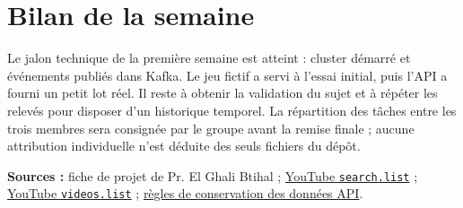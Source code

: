 \documentclass[11pt,a4paper]{article}
\begin{document}
\section{Bilan de la semaine}

Le jalon technique de la première semaine est atteint : cluster démarré et événements publiés dans Kafka. Le jeu fictif a servi à l'essai initial, puis l'API a fourni un petit lot réel. Il reste à obtenir la validation du sujet et à répéter les relevés pour disposer d'un historique temporel. La répartition des tâches entre les trois membres sera consignée par le groupe avant la remise finale ; aucune attribution individuelle n'est déduite des seuls fichiers du dépôt.

\smallskip
{\small\textbf{Sources :} fiche de projet de Pr. El Ghali Btihal ;
\href{https://developers.google.com/youtube/data/reference/rest/v3/search/list}{YouTube \texttt{search.list}} ;
\href{https://developers.google.com/youtube/data/reference/rest/v3/videos/list}{YouTube \texttt{videos.list}} ;
\href{https://developers.google.com/youtube/terms/developer-policies}{règles de conservation des données API}.}
\end{document}
